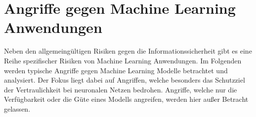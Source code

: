 \chapter{Angriffe gegen Machine Learning Anwendungen}\label{sec:angriffe}

Neben den allgemeingültigen Risiken gegen die Informationssicherheit gibt es eine Reihe spezifischer Risiken von Machine Learning Anwendungen.
Im Folgenden werden typische Angriffe gegen Machine Learning Modelle betrachtet und analysiert. 
Der Fokus liegt dabei auf Angriffen, welche besonders das Schutzziel der Vertraulichkeit bei neuronalen Netzen bedrohen.
Angriffe, welche nur die Verfügbarkeit oder die Güte eines Modells angreifen, werden hier außer Betracht gelassen.










